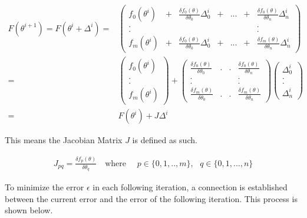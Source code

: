 \begin{align}
	F(\theta^{i+1}) = F(\theta^{i} + \Delta^{i}) =&
		\begin{pmatrix} f_0(\theta^{i}) &+& \frac{\delta f_0(\theta)}{\delta \theta_0} \Delta^{i}_0 &+& ... &+&  \frac{\delta f_0(\theta)}{\delta \theta_n} \Delta^{i}_n  \\
				. && && && . \\
				. && && && . \\
				f_m(\theta^{i}) &+& \frac{\delta f_0(\theta)}{\delta \theta_0} \Delta^{i}_0 &+& ... &+&  \frac{\delta f_m(\theta)}{\delta \theta_n} \Delta^{i}_n 
		\end{pmatrix} \label{eq:taylor1} \\
	=& \begin{pmatrix} f_0(\theta^{i}) \\ . \\ . \\ f_m(\theta^{i})  \end{pmatrix} +
		\begin{pmatrix} \frac{\delta f_0(\theta)}{\delta \theta_0} & . & . & \frac{\delta f_0(\theta)}{\delta \theta_n}  \\
					   . &&& . \\
					   . &&& . \\
					   \frac{\delta f_m(\theta)}{\delta \theta_0} & . & . & \frac{\delta f_m(\theta)}{\delta \theta_n}
		\end{pmatrix} \begin{pmatrix} \Delta^{i}_0 \\ . \\ . \\ \Delta^{i}_n \end{pmatrix}  \label{eq:taylor2} \\
	=& F(\theta^{i}) + J \Delta^{i} \label{eq:taylor3}
\end{align}

This means the Jacobian Matrix $J$ is defined as such.

\begin{align}
	J_{pq} = \frac{\delta f_p(\theta)}{\delta \theta_q} \quad \text{where } \quad p \in \{0,1,..,m\},\text{ } q \in \{0,1,...,n\}
\end{align}

To minimize the error $\epsilon$ in each following iteration, a connection is established between the current error and the
error of the following iteration. This process is shown below.

